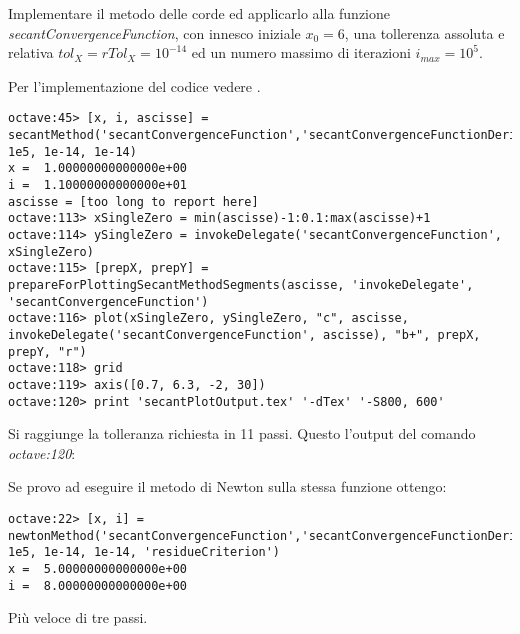 \begin{exercise}
Implementare il metodo delle corde ed applicarlo alla funzione
\emph{secantConvergenceFunction}, con innesco iniziale $x_{0} = 6$, una
tollerenza assoluta e relativa $tol_{X} = rTol_{X} = 10^{-14}$ ed un numero massimo di iterazioni
$i_{max} = 10^{5}$.
\end{exercise}
Per l'implementazione del codice vedere .
\begin{lstlisting}
octave:45> [x, i, ascisse] = secantMethod('secantConvergenceFunction','secantConvergenceFunctionDerivative',6,
1e5, 1e-14, 1e-14)
x =  1.00000000000000e+00
i =  1.10000000000000e+01
ascisse = [too long to report here]
octave:113> xSingleZero = min(ascisse)-1:0.1:max(ascisse)+1
octave:114> ySingleZero = invokeDelegate('secantConvergenceFunction', xSingleZero)
octave:115> [prepX, prepY] = prepareForPlottingSecantMethodSegments(ascisse, 'invokeDelegate', 'secantConvergenceFunction')
octave:116> plot(xSingleZero, ySingleZero, "c", ascisse, invokeDelegate('secantConvergenceFunction', ascisse), "b+", prepX, prepY, "r")
octave:118> grid
octave:119> axis([0.7, 6.3, -2, 30])
octave:120> print 'secantPlotOutput.tex' '-dTex' '-S800, 600'
\end{lstlisting}
Si raggiunge la tolleranza richiesta in 11 passi. Questo l'output del comando
\emph{octave:120}:
\begin{center}

\end{center}
\begin{oss}
Se provo ad eseguire il metodo di Newton sulla stessa funzione ottengo:
\begin{lstlisting}
octave:22> [x, i] =
newtonMethod('secantConvergenceFunction','secantConvergenceFunctionDerivative',6, 1e5, 1e-14, 1e-14, 'residueCriterion')
x =  5.00000000000000e+00
i =  8.00000000000000e+00
\end{lstlisting}
Pi\`u veloce di tre passi.
\end{oss}

